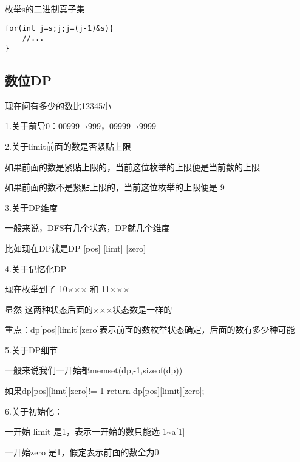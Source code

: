\documentclass[]{article}
\begin{document}
枚举s的二进制真子集

\begin{verbatim}
for(int j=s;j;j=(j-1)&s){
    //...
}
\end{verbatim}

\hypertarget{ux6570ux4f4ddp}{%
\subsection{数位DP}\label{ux6570ux4f4ddp}}

现在问有多少的数比12345小

1.关于前导0：00999→999，09999→9999

2.关于limit前面的数是否紧贴上限

如果前面的数是紧贴上限的，当前这位枚举的上限便是当前数的上限

如果前面的数不是紧贴上限的，当前这位枚举的上限便是 9

3.关于DP维度

一般来说，DFS有几个状态，DP就几个维度　　

比如现在DP就是DP {[}pos{]} {[}limt{]} {[}zero{]}

4.关于记忆化DP

现在枚举到了 10××× 和 11×××

显然 这两种状态后面的×××状态数是一样的

重点：dp{[}pos{]}{[}limit{]}{[}zero{]}表示前面的数枚举状态确定，后面的数有多少种可能

5.关于DP细节

一般来说我们一开始都memset(dp,-1,sizeof(dp))

如果dp{[}pos{]}{[}limt{]}{[}zero{]}!=-1 return
dp{[}pos{]}{[}limit{]}{[}zero{]};

6.关于初始化：

一开始 limit 是1，表示一开始的数只能选 1\textasciitilde{}a{[}1{]}

一开始zero 是1，假定表示前面的数全为0
\end{document}
